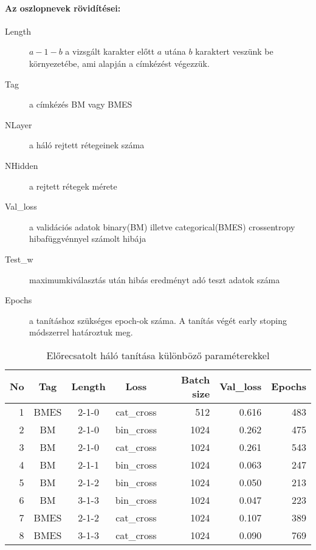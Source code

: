 \documentclass[a4paper, magyar]{article}
\begin{document}
\paragraph{Az oszlopnevek rövidítései:}
\begin{description}
	\item[Length] $a-1-b$ a vizsgált karakter előtt $a$ utána $b$ karaktert veszünk be környezetébe, ami alapján a címkézést végezzük.
	\item[Tag] a címkézés BM vagy BMES
	\item[NLayer] a háló rejtett rétegeinek száma
	\item[NHidden] a rejtett rétegek mérete
	\item[Val\_loss] a validációs adatok binary(BM) illetve categorical(BMES) crossentropy hibafüggvénnyel számolt hibája
	\item[Test\_w] maximumkiválasztás után hibás eredményt adó teszt adatok száma
	\item[Epochs] a tanításhoz szükséges epoch-ok száma. A tanítás végét early stoping módszerrel határoztuk meg.
\end{description}
\begin{table}[htp]\centering
	\begin{tabular}{|r|c|c|c|r|r|r|}
		\hline
		No&Tag&Length&Loss&Batch size&Val\_loss&Epochs\\
		\hline
		1&BMES&2-1-0&cat\_cross&512&0.616&483\\ 
		\hline
		2&BM&2-1-0&bin\_cross&1024&0.262&475\\
		\hline
		3&BM&2-1-0&cat\_cross&1024&0.261&543\\
		\hline
		4&BM&2-1-1&bin\_cross&1024&0.063&247\\
		\hline
		5&BM&2-1-2&bin\_cross&1024&0.050&213\\
		\hline
		6&BM&3-1-3&bin\_cross&1024&0.047&223\\
		\hline
		7&BMES&2-1-2&cat\_cross&1024&0.107&389\\
		\hline
		8&BMES&3-1-3&cat\_cross&1024&0.090&769\\
		\hline
	\end{tabular}
	\caption{Előrecsatolt háló tanítása különböző paraméterekkel}
	\label{tab:first_learn}
\end{table}
\end{document}
